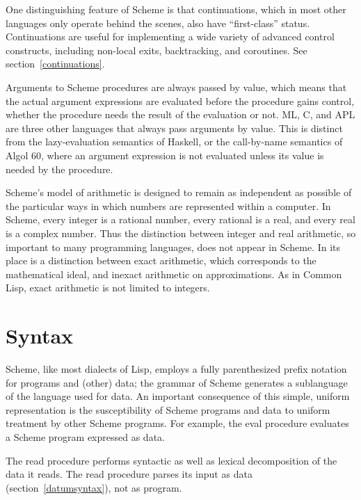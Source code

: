 \vest One distinguishing feature of Scheme is that continuations, which
in most other languages only operate behind the scenes, also have
``first-class'' status.  Continuations are useful for implementing a
wide variety of advanced control constructs, including non-local exits,
backtracking, and coroutines.  See section~\ref{continuations}.

\vest Arguments to Scheme procedures are always passed by value, which
means that the actual argument expressions are evaluated before the
procedure gains control, whether the procedure needs the result of the
evaluation or not.  ML, C, and APL are three other languages that always
pass arguments by value.
This is distinct from the lazy-evaluation semantics of Haskell,
or the call-by-name semantics of Algol 60, where an argument
expression is not evaluated unless its value is needed by the
procedure.


\vest Scheme's model of arithmetic is designed to remain as independent as
possible of the particular ways in which numbers are represented within a
computer. In Scheme, every integer is a rational number, every rational is a
real, and every real is a complex number.  Thus the distinction between integer
and real arithmetic, so important to many programming languages, does not
appear in Scheme.  In its place is a distinction between exact arithmetic,
which corresponds to the mathematical ideal, and inexact arithmetic on
approximations.  As in Common Lisp, exact arithmetic is not limited to
integers.

\section{Syntax}

Scheme, like most dialects of Lisp, employs a fully parenthesized prefix
notation for programs and (other) data; the grammar of Scheme generates a
sublanguage of the language used for data.  An important
consequence of this simple, uniform representation is the susceptibility of
Scheme programs and data to uniform treatment by other Scheme programs.
For example, the {\cf eval} procedure evaluates a Scheme program expressed
as data.

The {\cf read} procedure performs syntactic as well as lexical decomposition of
the data it reads.  The {\cf read} procedure parses its input as data
(section~\ref{datumsyntax}), not as program.

